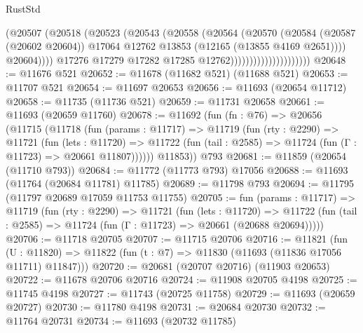 \begin{lexlean}{RustStd}
\begin{coremodule}
                                          (@20507
                                            (@20518
                                              (@20523
                                                (@20543
                                                  (@20558
                                                    (@20564
                                                      (@20570
                                                        (@20584
                                                          (@20587 (@20602 @20604))
                                                          @17064
                                                          @12762
                                                          @13853
                                                          (@12165 (@13855 @4169 @2651))))
                                                      @20604))))
                                              @17276
                                              @17279
                                              @17282
                                              @17285
                                              @12762)))))))))))))))))))))
@20648 := @11676 @521
@20652 := @11678 (@11682 @521) (@11688 @521)
@20653 := @11707 @521
@20654 := @11697 @20653
@20656 := @11693 (@20654 @11712)
@20658 := @11735 (@11736 @521)
@20659 := @11731 @20658
@20661 := @11693 (@20659 @11760)
@20678 := @11692
    (fun (fn : @76) =>
    @20656
      (@11715
        (@11718
          (fun (params : @11717) =>
          @11719
            (fun (rty : @2290) =>
            @11721
              (fun (lets : @11720) =>
              @11722 (fun (tail : @2585) => @11724 (fun (Γ : @11723) => @20661 @11807))))))
        @11853))
    @793
@20681 := @11859 (@20654 (@11710 @793))
@20684 := @11772 (@11773 @793) @17056
@20688 := @11693 (@11764 (@20684 @11781) @11785)
@20689 := @11798 @793
@20694 := @11795 (@11797 @20689 @17059 @11753 @11755)
@20705 := fun (params : @11717) =>
  @11719
    (fun (rty : @2290) =>
    @11721
      (fun (lets : @11720) =>
      @11722 (fun (tail : @2585) => @11724 (fun (Γ : @11723) => @20661 (@20688 @20694)))))
@20706 := @11718 @20705
@20707 := @11715 @20706
@20716 := @11821
    (fun (U : @11820) => @11822 (fun (t : @7) => @11830 (@11693 (@11836 @17056 @11711) @11847)))
@20720 := @20681 (@20707 @20716) (@11903 @20653)
@20722 := @11678 @20706 @20716
@20724 := @11908 @20705 @4198
@20725 := @11745 @4198
@20727 := @11743 (@20725 @11758)
@20729 := @11693 (@20659 @20727)
@20730 := @11780 @4198
@20731 := @20684 @20730
@20732 := @11764 @20731
@20734 := @11693 (@20732 @11785)

\end{coremodule}
\end{lexlean}
